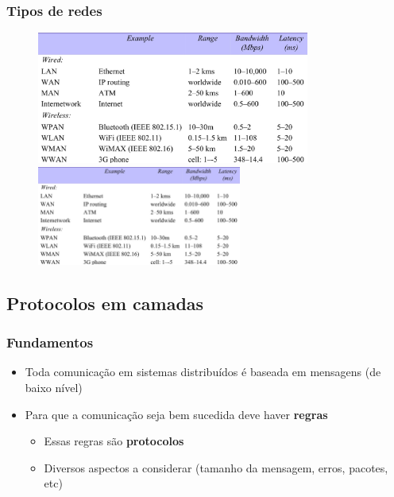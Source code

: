 \documentclass[xcolor=dvipsnames,10pt,compress,aspectratio=169]{beamer}
\begin{document}
\begin{frame}
  \frametitle{Tipos de redes}
  \begin{figure}[ht]
{
  \begin{center}
  \includegraphics[width=0.8\textwidth]{chap3-01-coulouris}
  \end{center}
}
{
  \begin{center}
  \includegraphics[width=0.6\textwidth]{chap3-01-coulouris}
  \end{center}
}
  \end{figure}
\end{frame}

\subsection{Protocolos em camadas}

\begin{frame}
  \frametitle{Fundamentos}
  \begin{itemize}
  \item Toda comunicação em sistemas distribuídos é baseada em mensagens (de baixo nível)
  \item Para que a comunicação seja bem sucedida deve haver \textbf{regras}
    \begin{itemize}
    \item Essas regras são \textbf{protocolos}
    \item Diversos aspectos a considerar (tamanho da mensagem, erros, pacotes, etc)
    \end{itemize}
  \end{itemize}
\end{frame}
\end{document}
